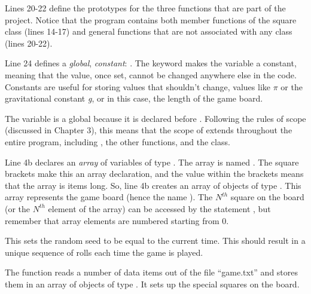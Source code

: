 
Lines 20-22 define the prototypes for the three functions that are part of the project.  Notice that the program contains both member functions of the square class (lines 14-17) and general functions that are not associated with any class (lines 20-22).  


Line 24 defines a \emph{global}, \emph{constant}: .  The keyword  makes the variable a constant, meaning that the value, once set, cannot be changed anywhere else in the code.  Constants are useful for storing values that shouldn't change, values like $\pi$ or the gravitational constant \emph{g}, or in this case, the length of the game board.

The variable  is a global because it is declared before .  Following the rules of scope (discussed in Chapter 3), this means that the scope of  extends throughout the entire program, including , the other functions, and the class.  


Line 4b declares an \emph{array} of variables of type .  The array is named .  The square brackets make this an array declaration, and the value  within the brackets means that the array is  items long.   So, line 4b creates an array of  objects of type .  This array represents the game board (hence the name ).  The $N^{th}$ square on the board (or the $N^{th}$ element of the array) can be accessed by the statement , but remember that array elements are numbered starting from 0.

This sets the random seed to be equal to the current time.  This should result in a unique sequence of rolls each time the game is played.


The  function reads a number of data items out of the file ``game.txt'' and stores them in an array of objects of type .   It sets up the special squares on the board.  

